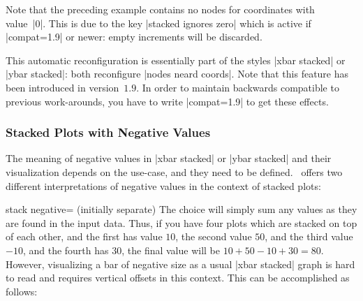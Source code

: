 {Note that the preceding example contains no nodes for coordinates with value~|0|. This is due to the key |stacked ignores zero| which is active if |compat=1.9| or newer: empty increments will be discarded.

This automatic reconfiguration is essentially part of the styles |xbar stacked| or |ybar stacked|: both reconfigure |nodes neard coords|. Note that this feature has been introduced in version~$1.9$. In order to maintain backwards compatible to previous work-arounds, you have to write |compat=1.9| to get these effects.

\begin{codeexample}[]
\end{codeexample}

\subsubsection{Stacked Plots with Negative Values}

The meaning of negative values in |xbar stacked| or |ybar stacked| and their visualization depends on the use-case, and they need to be defined. \PGFPlots\ offers two different interpretations of negative values in the context of stacked plots:

\begin{pgfplotskey}{stack negative= (initially separate)}
	The choice  will simply sum any values as they are found in the input data. Thus, if you have four plots which are stacked on top of each other, and the first has value $10$, the second value $50$, and the third value $-10$, and the fourth has $30$, the final value will be $10+50-10+30 = 80$. However, visualizing a bar of negative size as a usual |xbar stacked| graph is hard to read and requires vertical offsets in this context. This can be accomplished as follows:
\begin{codeexample}[]
\end{codeexample}
\end{pgfplotskey}}
